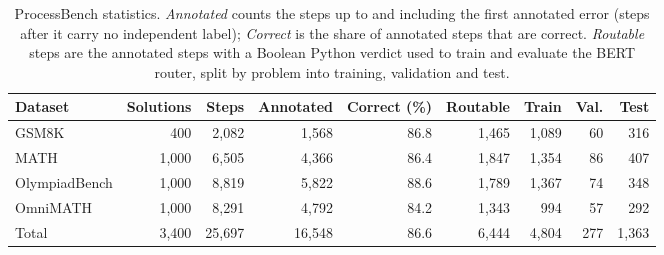 \begin{table}[ht]
\centering
\small
\begin{tabular}{lrrrrrrrr}
\hline
\textbf{Dataset} & \textbf{Solutions} & \textbf{Steps} & \textbf{Annotated} & \textbf{Correct (\%)} & \textbf{Routable} & \textbf{Train} & \textbf{Val.} & \textbf{Test} \\
\hline
GSM8K & 400 & 2,082 & 1,568 & 86.8 & 1,465 & 1,089 & 60 & 316 \\
MATH & 1,000 & 6,505 & 4,366 & 86.4 & 1,847 & 1,354 & 86 & 407 \\
OlympiadBench & 1,000 & 8,819 & 5,822 & 88.6 & 1,789 & 1,367 & 74 & 348 \\
OmniMATH & 1,000 & 8,291 & 4,792 & 84.2 & 1,343 & 994 & 57 & 292 \\
\hline
Total & 3,400 & 25,697 & 16,548 & 86.6 & 6,444 & 4,804 & 277 & 1,363 \\
\hline
\end{tabular}
\caption{ProcessBench statistics. \emph{Annotated} counts the steps up to and including the first annotated error (steps after it carry no independent label); \emph{Correct} is the share of annotated steps that are correct. \emph{Routable} steps are the annotated steps with a Boolean Python verdict used to train and evaluate the BERT router, split by problem into training, validation and test.}
\label{tab:data_stats}
\end{table}
